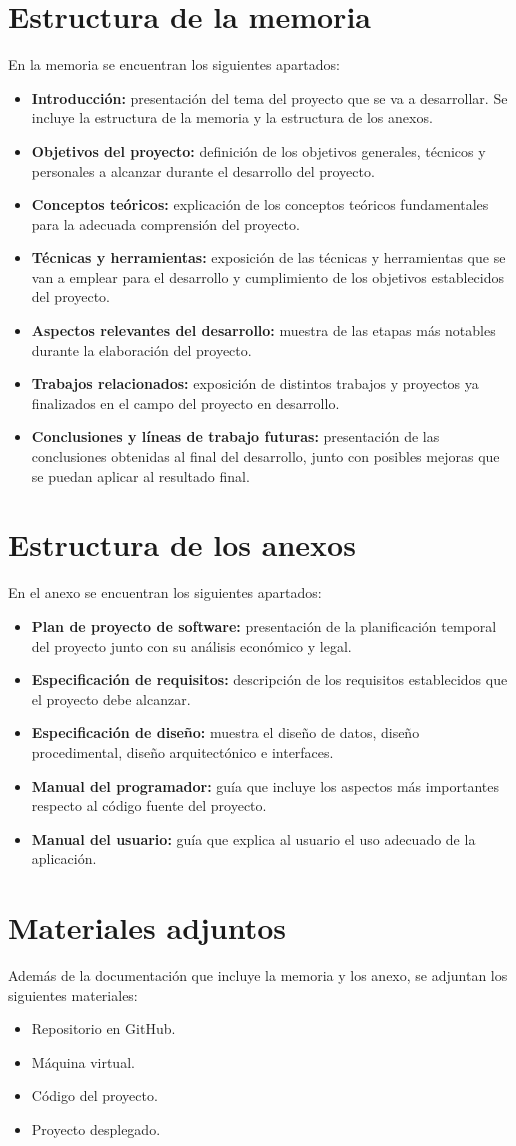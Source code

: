 \section{Estructura de la memoria}
En la memoria se encuentran los siguientes apartados:
\begin{itemize}
    \item \textbf{Introducción:} presentación del tema del proyecto que se va a desarrollar. Se incluye la estructura de la memoria y la estructura de los anexos.
    \item \textbf{Objetivos del proyecto:} definición de los objetivos generales, técnicos y personales a alcanzar durante el desarrollo del proyecto.
    \item \textbf{Conceptos teóricos:} explicación de los conceptos teóricos fundamentales para la adecuada comprensión del proyecto.
    \item \textbf{Técnicas y herramientas:} exposición de las técnicas y herramientas que se van a emplear para el desarrollo y cumplimiento de los objetivos establecidos del proyecto.
    \item \textbf{Aspectos relevantes del desarrollo:} muestra de las etapas más notables durante la elaboración del proyecto. 
    \item \textbf{Trabajos relacionados:} exposición de distintos trabajos y proyectos ya finalizados en el campo del proyecto en desarrollo.
    \item \textbf{Conclusiones y líneas de trabajo futuras:} presentación de las conclusiones obtenidas al final del desarrollo, junto con posibles mejoras que se puedan aplicar al resultado final.
\end{itemize}

\section{Estructura de los anexos}
En el anexo se encuentran los siguientes apartados:
\begin{itemize}
    \item \textbf{Plan de proyecto de software:} presentación de la planificación temporal del proyecto junto con su análisis económico y legal.
    \item \textbf{Especificación de requisitos:} descripción de los requisitos establecidos que el proyecto debe alcanzar.
    \item \textbf{Especificación de diseño:} muestra el diseño de datos, diseño procedimental, diseño arquitectónico e interfaces.
    \item \textbf{Manual del programador:} guía que incluye los aspectos más importantes respecto al código fuente del proyecto.
    \item \textbf{Manual del usuario:} guía que explica al usuario el uso adecuado de la aplicación.
\end{itemize}

\section{Materiales adjuntos}
Además de la documentación que incluye la memoria y los anexo, se adjuntan los siguientes materiales:
\begin{itemize}
    \item Repositorio en GitHub.
    \item Máquina virtual.
    \item Código del proyecto.
    \item Proyecto desplegado.  
\end{itemize}